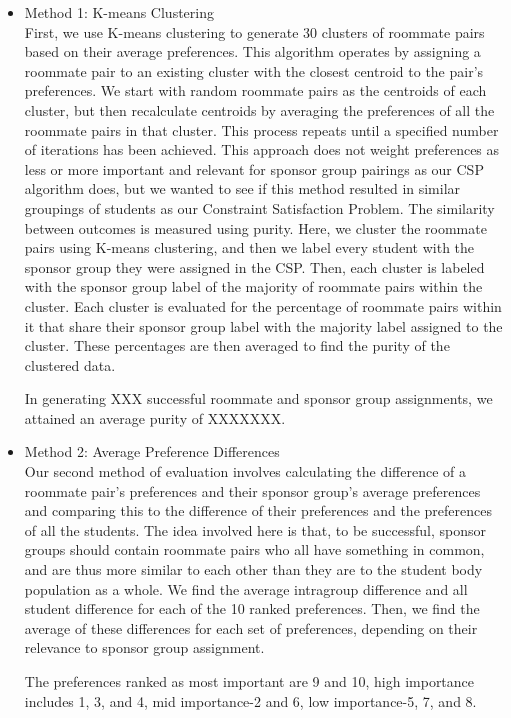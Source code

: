 \documentclass[letterpaper]{article}
\begin{document}
\begin{itemize}
\item{Method 1: K-means Clustering} \\
First, we use K-means clustering to generate 30 clusters of roommate pairs based on their average preferences. This algorithm operates by assigning a roommate pair to an existing cluster with the closest centroid to the pair's preferences. We start with random roommate pairs as the centroids of each cluster, but then recalculate centroids by averaging the preferences of all the roommate pairs in that cluster. This process repeats until a specified number of iterations has been achieved. This approach does not weight preferences as less or more important and relevant for sponsor group pairings as our CSP algorithm does, but we wanted to see if this method resulted in similar groupings of students as our Constraint Satisfaction Problem. The similarity between outcomes is measured using purity. Here, we cluster the roommate pairs using K-means clustering, and then we label every student with the sponsor group they were assigned in the CSP. Then, each cluster is labeled with the sponsor group label of the majority of roommate pairs within the cluster. Each cluster is evaluated for the percentage of roommate pairs within it that share their sponsor group label with the majority label assigned to the cluster. These percentages are then averaged to find the purity of the clustered data. 

In generating XXX successful roommate and sponsor group assignments, we attained an average purity of XXXXXXX.

\item{Method 2: Average Preference Differences} \\
Our second method of evaluation involves calculating the difference of a roommate pair's preferences and their sponsor group's average preferences and comparing this to the difference of their preferences and the preferences of all the students. The idea involved here is that, to be successful, sponsor groups should contain roommate pairs who all have something in common, and are thus more similar to each other than they are to the student body population as a whole. We find the average intragroup difference and all student difference for each of the 10 ranked preferences. Then, we find the average of these differences for each set of preferences, depending on their relevance to sponsor group assignment. 

The preferences ranked as most important are 9 and 10, high importance includes 1, 3, and 4, mid importance-2 and 6, low importance-5, 7, and 8.  


\end{itemize}
\end{document}
